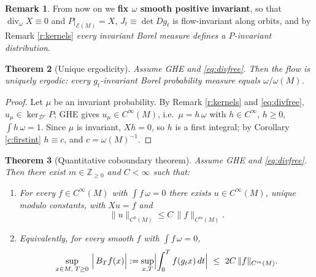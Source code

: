 \documentclass[11pt]{amsart}
\theoremstyle{plain}
\newtheorem{theorem}{Theorem}[section]
\theoremstyle{definition}
\newtheorem{remark}[theorem]{Remark}
\theoremstyle{remark}
\newcommand{\DD}{\mathcal{D}'}
\newcommand{\EE}{\mathcal{E}}
\newcommand{\flow}{g_t}
\begin{document}
\begin{remark}
From now on we \textbf{fix $\omega$ smooth positive invariant}, so
that $\operatorname{div}_\omega X\equiv 0$ and
$P|_{\EE(M)}=X$, $J_t\equiv\det Dg_t$ is flow-invariant along
orbits, and by Remark \ref{r:kernels} \emph{every invariant Borel
measure defines a $P$-invariant distribution}.
\end{remark}

\begin{theorem}[Unique ergodicity]\label{t:uniqerg}
Assume GHE and \eqref{eq:divfree}.  Then the flow is uniquely
ergodic: every $\flow$-invariant Borel probability measure equals
$\omega/\omega(M)$.
\end{theorem}

\begin{proof}
Let $\mu$ be an invariant probability.  By Remark \ref{r:kernels}
and \eqref{eq:divfree}, $u_\mu\in\ker_{\DD}P$; GHE gives
$u_\mu\in C^\infty(M)$, i.e.\ $\mu=h\,\omega$ with
$h\in C^\infty$, $h\ge0$, $\int h\,\omega=1$.  Since $\mu$ is
invariant, $Xh=0$, so $h$ is a first integral; by Corollary
\ref{c:firstint} $h\equiv c$, and $c=\omega(M)^{-1}$.
\end{proof}

\begin{theorem}[Quantitative coboundary theorem]\label{t:quant}
Assume GHE and \eqref{eq:divfree}.  Then there exist $m\in\mathbb
Z_{\ge0}$ and $C<\infty$ such that:
\begin{enumerate}
\item[(i)] For every $f\in C^\infty(M)$ with $\int f\,\omega=0$
there exists $u\in C^\infty(M)$, unique modulo constants, with
$Xu=f$ and
\[
\|u\|_{C^0(M)}\le C\,\|f\|_{C^{m}(M)} .
\]
\item[(ii)] Equivalently, for every smooth $f$ with $\int f\,\omega=0$,
\begin{equation}\label{eq:UB}
\sup_{x\in M,\;T\ge0}\ \Bigl|\,B_T f(x)\Bigr|
:=\sup_{x,T}\Bigl|\int_0^{T}f(g_tx)\,dt\Bigr|\ \le\ 2C\,
\|f\|_{C^{m}(M)} .
\end{equation}
\end{enumerate}
\end{theorem}
\end{document}
